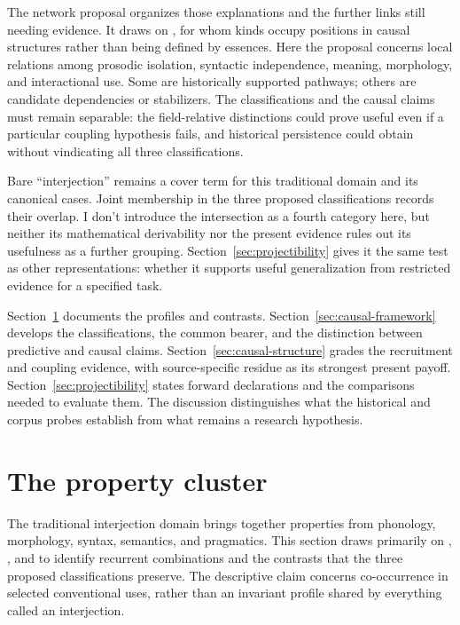 \documentclass[12pt]{article}
\begin{document}
The network proposal organizes those explanations and the further links still needing evidence. It draws on \textcite{khalidi2013,khalidi2018nodes}, for whom kinds occupy positions in causal structures rather than being defined by essences. Here the proposal concerns local relations among prosodic isolation, syntactic independence, meaning, morphology, and interactional use. Some are historically supported pathways; others are candidate dependencies or stabilizers. The classifications and the causal claims must remain separable: the field-relative distinctions could prove useful even if a particular coupling hypothesis fails, and historical persistence could obtain without vindicating all three classifications.

Bare \enquote{interjection} remains a cover term for this traditional domain and its canonical cases. Joint membership in the three proposed classifications records their overlap. I don't introduce the intersection as a fourth category here, but neither its mathematical derivability nor the present evidence rules out its usefulness as a further grouping. Section~\ref{sec:projectibility} gives it the same test as other representations: whether it supports useful generalization from restricted evidence for a specified task.

Section~\ref{sec:cluster} documents the profiles and contrasts. Section~\ref{sec:causal-framework} develops the classifications, the common bearer, and the distinction between predictive and causal claims. Section~\ref{sec:causal-structure} grades the recruitment and coupling evidence, with source-specific residue as its strongest present payoff. Section~\ref{sec:projectibility} states forward declarations and the comparisons needed to evaluate them. The discussion distinguishes what the historical and corpus probes establish from what remains a research hypothesis.

\section{The property cluster}\label{sec:cluster}

The traditional interjection domain brings together properties from phonology, morphology, syntax, semantics, and pragmatics. This section draws primarily on \textcite{ameka1992}, \textcite{quirk1985}, and \textcite{HuddlestonPullum2002} to identify recurrent combinations and the contrasts that the three proposed classifications preserve. The descriptive claim concerns co-occurrence in selected conventional uses, rather than an invariant profile shared by everything called an interjection.
\end{document}
